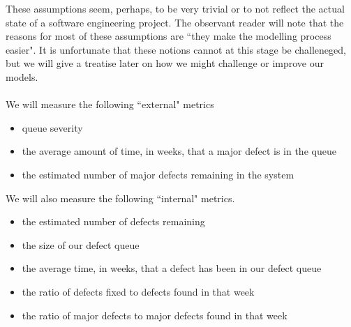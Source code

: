 These assumptions seem, perhaps, to be very trivial or to not reflect the actual state of a software
engineering project.
The observant reader will note that the reasons for most of these assumptions are ``they make the modelling
process easier".
It is unfortunate that these notions cannot at this stage be challeneged, but we will give a
treatise later on how we might challenge or improve our models.\\
\\
We will measure the following ``external" metrics
\begin{itemize}
	\item queue severity
	\item the average amount of time, in weeks, that a major defect is in the queue
	\item the estimated number of major defects remaining in the system
\end{itemize}

We will also measure the following ``internal" metrics.
\begin{itemize}
	\item the estimated number of defects remaining
	\item the size of our defect queue
	\item the average time, in weeks, that a defect has been in our defect queue
	\item the ratio of defects fixed to defects found in that week
	\item the ratio of major defects to major defects found in that week
\end{itemize}
